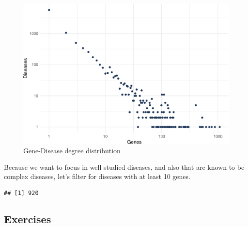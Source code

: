 \documentclass[
]{book}
\newenvironment{Shaded}{\begin{snugshade}}{\end{snugshade}}
\newcommand{\AttributeTok}[1]{\textcolor[rgb]{0.77,0.63,0.00}{#1}}
\newcommand{\DecValTok}[1]{\textcolor[rgb]{0.00,0.00,0.81}{#1}}
\newcommand{\FunctionTok}[1]{\textcolor[rgb]{0.00,0.00,0.00}{#1}}
\newcommand{\NormalTok}[1]{#1}
\newcommand{\SpecialCharTok}[1]{\textcolor[rgb]{0.00,0.00,0.00}{#1}}
\begin{document}
\begin{figure}
\centering
\includegraphics{NetMed_files/figure-latex/unnamed-chunk-11-1.pdf}
\caption{\label{fig:unnamed-chunk-11}Gene-Disease degree distribution}
\end{figure}

Because we want to focus in well studied diseases, and also that are known to be complex diseases, let's filter for diseases with at least 10 genes.

\begin{Shaded}
\end{Shaded}

\begin{verbatim}
## [1] 920
\end{verbatim}

\hypertarget{exercises-1}{%
\subsection{Exercises}\label{exercises-1}}
\end{document}
